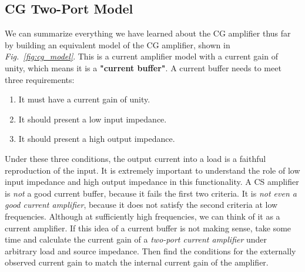 \subsection{CG Two-Port Model}
We can summarize everything we have learned about the CG amplifier thus far by building an equivalent model of the CG amplifier, shown in \emph{Fig.~\ref{fig:cg_model}}.  This is a current amplifier model with a current gain of unity, which means it is a \textbf{"current buffer"}.  A current buffer needs to meet three requirements:
\vspace{0.25cm}
    \begin{enumerate}
        \setlength\itemsep{0.15cm}
        \item{It must have a current gain of unity.}
        \item{It should present a low input impedance.}
        \item{It should present a high output impedance.}
    \end{enumerate}
\vspace{0.25cm}
Under these three conditions, the output current into a load is a faithful reproduction of the input.  It is extremely important to understand the role of low input impedance and high output impedance in this functionality.  A CS amplifier is \textit{not} a good current buffer, because it fails the first two criteria.  It is \textit{not even a good current amplifier}, because it does not satisfy the second criteria at low frequencies.  Although at sufficiently high frequencies, we can think of it as a current amplifier.  If this idea of a current buffer is not making sense, take some time and calculate the current gain of a \textit{two-port current amplifier} under arbitrary load and source impedance.  Then find the conditions for the externally observed current gain to match the internal current gain of the amplifier.
\newpage
